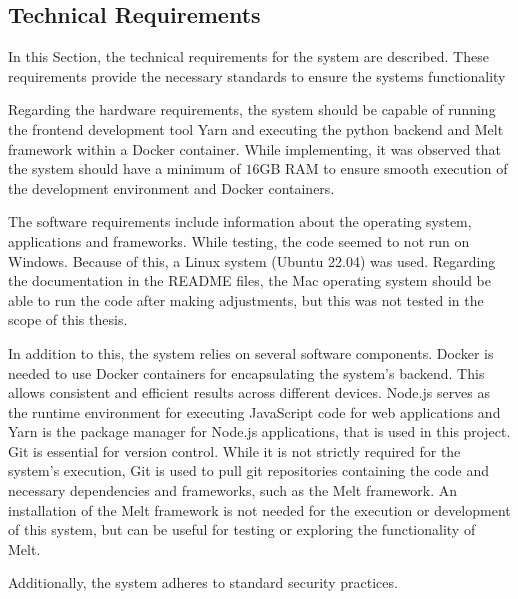 \documentclass[../MasterThesis.tex]{subfiles}
\begin{document}
\subsection{Technical Requirements} \label{subsection:technicalrequirements}


In this Section, the technical requirements for the system are described. These requirements provide the necessary standards to ensure the systems functionality

Regarding the hardware requirements, the system should be capable of running the frontend development tool Yarn and executing the python backend and Melt framework within a Docker container.
While implementing, it was observed that the system should have a minimum of $16$GB RAM to ensure smooth execution of the development environment and Docker containers.



The software requirements include information about the operating system, applications and frameworks.
While testing, the code seemed to not run on Windows. Because of this, a Linux system (Ubuntu 22.04) was used. Regarding the documentation in the README files, the Mac operating system should be able to run the code after making adjustments, but this was not tested in the scope of this thesis.


In addition to this, the system relies on several software components.
Docker is needed to use Docker containers for encapsulating the system's backend. This allows consistent and efficient results across different devices.
Node.js serves as the runtime environment for executing JavaScript code for web applications and Yarn is the package manager for Node.js applications, that is used in this project.
Git is essential for version control. While it is not strictly required for the system's execution, Git is used to pull git repositories containing the code and necessary dependencies and frameworks, such as the Melt framework. 
An installation of the Melt framework is not needed for the execution or development of this system, but can be useful for testing or exploring the functionality of Melt.

Additionally, the system adheres to standard security practices.


	
	
	
	
\end{document}
